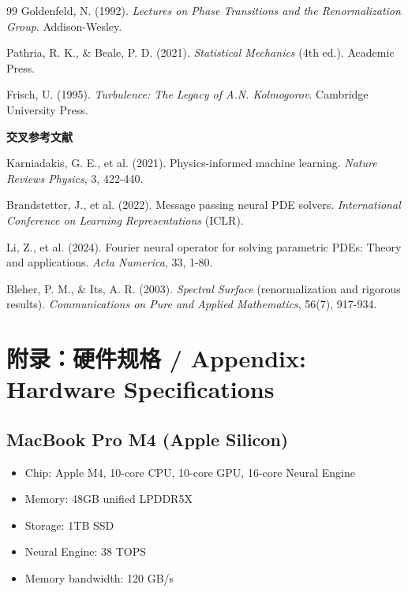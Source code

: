 \documentclass[12pt,a4paper,twoside]{article}
\begin{document}
\begin{inversation}
\begin{thebibliography}{99}
\vspace{0.2cm}
\noindent[34] Goldenfeld, N. (1992). \textit{Lectures on Phase Transitions and the Renormalization Group}. Addison-Wesley.

\vspace{0.2cm}
\noindent[35] Pathria, R. K., \& Beale, P. D. (2021). \textit{Statistical Mechanics} (4th ed.). Academic Press.

\vspace{0.2cm}
\noindent[36] Frisch, U. (1995). \textit{Turbulence: The Legacy of A.N. Kolmogorov}. Cambridge University Press.

\vspace{0.5cm}
\noindent\textbf{交叉参考文献}

\vspace{0.2cm}
\noindent[37] Karniadakis, G. E., et al. (2021). Physics-informed machine learning. \textit{Nature Reviews Physics}, 3, 422-440.

\vspace{0.2cm}
\noindent[38] Brandstetter, J., et al. (2022). Message passing neural PDE solvers. \textit{International Conference on Learning Representations} (ICLR).

\vspace{0.2cm}
\noindent[39] Li, Z., et al. (2024). Fourier neural operator for solving parametric PDEs: Theory and applications. \textit{Acta Numerica}, 33, 1-80.

\vspace{0.2cm}
\noindent[40] Bleher, P. M., \& Its, A. R. (2003). \textit{Spectral Surface} (renormalization and rigorous results). \textit{Communications on Pure and Applied Mathematics}, 56(7), 917-934.

\end{thebibliography}

\clearpage

\section*{附录：硬件规格 / Appendix: Hardware Specifications}

\subsection*{MacBook Pro M4 (Apple Silicon)}
\begin{itemize}
    \item Chip: Apple M4, 10-core CPU, 10-core GPU, 16-core Neural Engine
    \item Memory: 48GB unified LPDDR5X
    \item Storage: 1TB SSD
    \item Neural Engine: 38 TOPS
    \item Memory bandwidth: 120 GB/s
\end{itemize}


\end{inversation}
\end{document}
